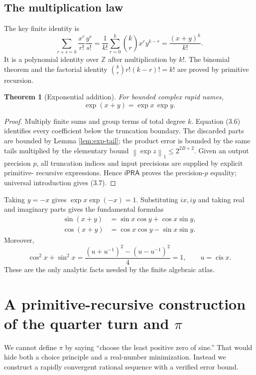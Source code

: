 \documentclass[11pt]{article}
\newtheorem{theorem}{Theorem}[section]
\theoremstyle{definition}
\newcommand{\Z}{\mathbb Z}
\newcommand{\iPRA}{\mathsf{iPRA}}
\newcommand{\cis}{\operatorname{cis}}
\newcommand{\norm}[1]{\left\lVert#1\right\rVert}
\begin{document}
\subsection{The multiplication law}

The key finite identity is
\[
 \sum_{r+s=k}\frac{x^r}{r!}\frac{y^s}{s!}
 =\frac1{k!}\sum_{r=0}^k\binom{k}{r}x^r y^{k-r}
 =\frac{(x+y)^k}{k!}.
 \tag{3.6}
\]
It is a polynomial identity over \(\Z\) after multiplication by \(k!\).
The binomial theorem and the factorial identity
\(\binom{k}{r}r!(k-r)!=k!\) are proved by primitive recursion.

\begin{theorem}[Exponential addition]
\label{thm:exp-add}
For bounded complex rapid names,
\[
 \exp(x+y)=\exp x\,\exp y.
 \tag{3.7}
\]
\end{theorem}

\begin{proof}
Multiply finite sums and group terms of total degree \(k\).  Equation (3.6)
identifies every coefficient below the truncation boundary.  The discarded
parts are bounded by Lemma \ref{lem:exp-tail}; the product error is bounded by
the same tails multiplied by the elementary bound
\(\norm{\exp z}_1\le 2^{2B+2}\).  Given an output precision \(p\), all
truncation indices and input precisions are supplied by explicit primitive-
recursive expressions.  Hence \(\iPRA\) proves the precision-\(p\) equality;
universal introduction gives (3.7).
\end{proof}

Taking \(y=-x\) gives \(\exp x\exp(-x)=1\).  Substituting \(ix,iy\) and taking
real and imaginary parts gives the fundamental formulas
\begin{align}
 \sin(x+y)&=\sin x\cos y+\cos x\sin y,\tag{3.8}\\
 \cos(x+y)&=\cos x\cos y-\sin x\sin y.\tag{3.9}
\end{align}
Moreover,
\[
 \cos^2x+\sin^2x
 =\frac{(u+u^{-1})^2-(u-u^{-1})^2}{4}=1,
 \qquad u=\cis x.
 \tag{3.10}
\]
These are the only analytic facts needed by the finite algebraic atlas.

\section{A primitive-recursive construction of the quarter turn and \(\pi\)}
\label{sec:pi}

We cannot define \(\pi\) by saying ``choose the least positive zero of sine.''
That would hide both a choice principle and a real-number minimization.  Instead
we construct a rapidly convergent rational sequence with a verified error
bound.
\end{document}

